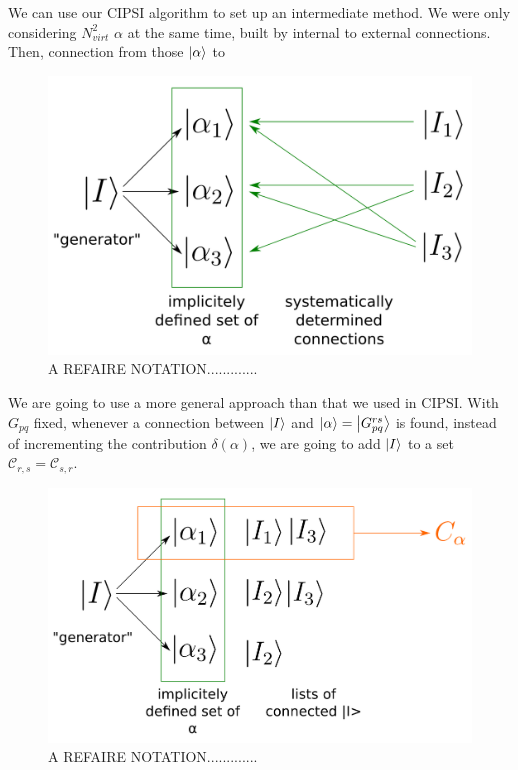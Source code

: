 \documentclass[./thesis.tex]{subfiles}
\begin{document}
We can use our CIPSI algorithm to set up an intermediate method. We were only considering $N_{virt}^2$ $\alpha$ at the same time, built by internal to external connections. Then, connection from those ${\ket{\alpha}}$ to 


\begin{figure}[h!]
	\begin{center}
		\includegraphics[width=0.7\columnwidth]{figures/matrix_dressing/findconnections}
		\caption{A REFAIRE NOTATION.............}
		\label{fig:findconnections}
	\end{center}
\end{figure}



We are going to use a more general approach than that we used in CIPSI. With $G_{pq}$ fixed, whenever a connection between $\ket I$ and ${\ket{\alpha}} = \ket {G_{pq}^{rs}}$ is found, instead of incrementing the contribution $\delta(\alpha)$, we are going to add ${\ket{I}}$ to a set $\mathcal{C}_{r,s} = \mathcal{C}_{s,r}$.

\begin{figure}[h!]
	\begin{center}
		\includegraphics[width=0.7\columnwidth]{figures/matrix_dressing/buildlists}
		\caption{A REFAIRE NOTATION.............}
		\label{fig:buildlists}
	\end{center}
\end{figure}
\end{document}

